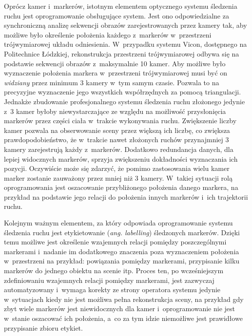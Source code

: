 Oprócz kamer i~markerów, istotnym elementem optycznego systemu śledzenia ruchu jest oprogramowanie obsługujące system. Jest ono odpowiedzialne za synchroniczną analizę sekwencji obrazów zarejestrowanych przez kamery tak, aby możliwe było określenie położenia każdego z~markerów w~przestrzeni trójwymiarowej układu odniesienia. W~przypadku systemu Vicon, dostępnego na Politechnice Łódzkiej, rekonstrukcja przestrzeni trójwymiarowej odbywa się na podstawie sekwencji obrazów z~maksymalnie 10 kamer. Aby możliwe było wyznaczenie położenia markera w~przestrzeni trójwymiarowej musi być on \textsl{widziany} przez minimum 3 kamery w~tym samym czasie. Pozwala to na precyzyjne wyznaczenie jego wszystkich współrzędnych za pomocą triangulacji. Jednakże zbudowanie profesjonalnego systemu śledzenia ruchu złożonego jedynie z~3 kamer byłoby niewystarczające ze względu na możliwość przysłonięcia markerów przez części ciała w~trakcie wykonywania ruchu. Zwiększenie liczby kamer pozwala na obserwowanie sceny przez większą ich liczbę, co zwiększa prawdopodobieństwo, że w~trakcie nawet złożonych ruchów przynajmniej 3 kamery zarejestrują każdy z~markerów. Dodatkowo redundancja danych, dla lepiej widocznych markerów, sprzyja zwiększeniu dokładności wyznaczania ich pozycji. Oczywiście może się zdarzyć, że pomimo zastosowania wielu kamer marker zostanie zauważony przez mniej niż 3 kamery. W~takiej sytuacji rolą oprogramowania jest oszacowanie przybliżonego położenia danego markera, na przykład na podstawie jego relacji do położenia innych markerów i~ich trajektorii ruchu.
			
Kolejnym ważnym elementem, za który odpowiada oprogramowanie systemu śledzenia ruchu jest etykietowanie (\emph{ang. labelling}) śledzonych markerów. Dzięki temu możliwe jest określenie wzajemnych relacji pomiędzy poszczególnymi markerami i~nadanie im dodatkowego znaczenia poza wyznaczeniem położenia w~przestrzeni na przykład: powiązania pomiędzy markerami, przypisanie kilku markerów do jednego obiektu na scenie itp. Proces ten, po wcześniejszym zdefiniowaniu wzajemnych relacji pomiędzy markerami, jest zazwyczaj automatyzowany i~wymaga korekty ze strony operatora systemu jedynie w~sytuacjach kiedy nie jest możliwa pełna rekonstrukcja sceny, na przykład gdy zbyt wiele markerów jest niewidocznych dla kamer i~oprogramowanie nie jest w~stanie oszacować ich położenia, a~co za tym idzie niemożliwe jest prawidłowe przypisanie zbioru etykiet.

